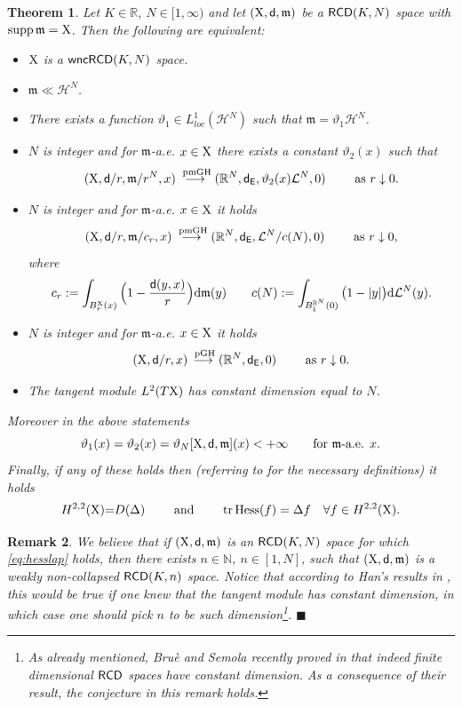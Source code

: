 \documentclass[reqno,11pt]{article}
\numberwithin{equation}{section}
\renewcommand{\H}{\mathbb{H}}
\newcommand{\N}{\mathbb{N}}
\newcommand{\R}{\mathbb{R}}
\newcommand{\mm}{{\mbox{\boldmath$m$}}}
\newcommand{\sfd}{{\sf d}}
\newcommand{\supp}{\mathop{\rm supp}\nolimits}   %
\renewcommand{\d}{{\mathrm d}}
\newcommand{\fr}{\penalty-20\null\hfill$\blacksquare$}                      %
\renewcommand{\mm}{\mathfrak m}                                %
\newtheorem{theorem}{Theorem}[section]
\newtheorem{remark}[theorem]{Remark}
\newcommand{\X}{{\rm X}}
\newcommand{\RCD}{{\sf RCD}}
\newcommand{\wncRCD}{{\sf wncRCD}}
\newcommand{\Eu}{{\sf E}}
\renewcommand{\H}[1]{{\rm Hess}(#1)}
\newcommand{\HH}{{\mathcal H}}
\newcommand{\LL}{{\mathcal L}}
\begin{document}
\begin{theorem}\label{thm:wncpropp}
 Let $K\in\R$, {$N\in [1,\infty)$} and let $(\X,\sfd,\mm)$ be a $\RCD(K,N)$ space with \(\supp \mm=\X\). Then the following are equivalent:
 \begin{itemize}
 \item[(i)] \(\X\) is a $\wncRCD(K,N)$ space.
\item[(ii)] \(\mm\ll  \HH^N\). 
 \item[(iii)] There exists a function \(\vartheta_1\in L^1_{loc}(\HH^N)\) such that \(\mm=\vartheta_1 \HH^N\). 
 \item[(iv)]  \(N\) is integer and for \(\mm\)-a.e. \(x\in \X\) there exists a constant \(\vartheta_2(x)\) such that
   \[
    (\X,\sfd/{r},\mm/r^N,x)\overset{\textrm{ pmGH}}{\longrightarrow} (\R^N, \sfd_{\Eu},\vartheta_2 (x)\LL^N,0) \qquad\text{ as }r\downarrow0.
   \]
\item[(v)] \(N\) is integer and for \(\mm\)-a.e. \(x\in \X\) it holds
   \[
    (\X,\sfd/{r},\mm/c_r,x)\overset{\textrm{ pmGH}}{\longrightarrow} (\R^N, \sfd_{\Eu},\LL^N/c(N),0) \qquad\text{ as }r\downarrow0,
   \]
where
\[
c_r:=\int_{B^{\X}_r(x)}\Big(1-\frac{\sfd(y,x)}{r}\Big)\d\mm(y)\qquad c(N):=\int_{B^{\R^N}_1(0)}\big(1-|y|\big)\d\LL^N(y).
\]
\item[(vi)] $N$ is integer and for \(\mm\)-a.e. \(x\in \X\) it holds
   \[
    (\X,\sfd/{r},x)\overset{\textrm{ pGH}}{\longrightarrow} (\R^N, \sfd_{\Eu},0)\qquad\text{ as }r\downarrow0 .
   \]
 \item[(vii)] The  tangent module \(L^2(T\X)\)  has constant dimension equal to  \(N\).
 \end{itemize}
Moreover  in the above statements
 \begin{equation}
\label{eq:stessedens}
 \vartheta_1(x)=\vartheta_2(x)=\vartheta_N[\X,\sfd,\mm](x)<+\infty\qquad\textrm{for \(\mm\)-a.e. \(x\)}.
\end{equation}
Finally, if any of these holds then {(referring to \cite{Gigli14} for the necessary definitions) it holds}
\begin{equation}
\label{eq:hesslap}
H^{2,2}(\X){=} D(\Delta)\qquad\text{ and }\qquad {\rm tr}\,\H f=\Delta f\quad\forall f\in H^{2,2}(\X).
\end{equation}
 \end{theorem}
\begin{remark}{\rm We believe that if $(\X,\sfd,\mm)$ is an $\RCD(K,N)$ space for which \eqref{eq:hesslap} holds, then there exists $n\in\N$, $n\in[1,N]$, such that $(\X,\sfd,\mm)$ is a weakly non-collapsed $\RCD(K,n)$ space. Notice that according to Han's results in \cite{Han14}, this would be true if one knew that the tangent module has constant dimension, in which case one should pick $n$ to be such dimension\footnote{As already mentioned, Bru\`e and Semola recently proved in \cite{BS18} that indeed finite dimensional $\RCD$ spaces have constant dimension. As a consequence of their result, the conjecture in this remark holds.
}. 
}\fr\end{remark}
\end{document}
